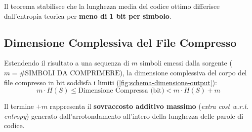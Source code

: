 Il teorema stabilisce che la lunghezza media del codice ottimo differisce dall'entropia teorica per \textbf{meno di 1 bit per simbolo}.

\FloatBarrier
\subsection{Dimensione Complessiva del File Compresso}
\label{subsec:dimensione-complessiva-file}

Estendendo il risultato a una sequenza di $m$ simboli emessi dalla sorgente ($m = \text{\# SIMBOLI DA COMPRIMERE}$), la dimensione complessiva del corpo del file compresso in bit soddisfa i limiti (\autoref{fig:schema-dimensione-output}):
\begin{equation}
  m \cdot H(S) \le \text{Dimensione Compressa (bit)} < m \cdot H(S) + m
\end{equation}

Il termine $+m$ rappresenta il \textbf{sovraccosto additivo massimo} (\textit{extra cost w.r.t. entropy}) generato dall'arrotondamento all'intero della lunghezza delle parole di codice.


